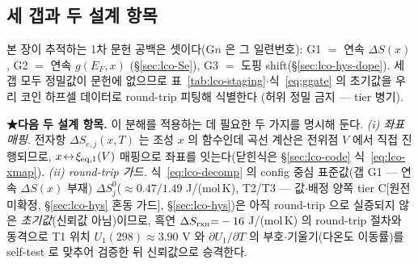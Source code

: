 \subsection{세 갭과 두 설계 항목}\label{sec:lco-decomp-gaps}
본 장이 추적하는 1차 문헌 공백은 셋이다(G$n$ 은 그 일련번호): G1 $=$ 연속 $\Delta S(x)$, G2 $=$ 연속 $g(E_F,x)$
(\S\ref{sec:lco-Se}), G3 $=$ 도핑 shift(\S\ref{sec:lco-hys-dope}). 세 갭 모두 정밀값이 문헌에 없으므로
표~\ref{tab:lco-staging}$\cdot$식~\eqref{eq:ggate} 의 초기값을 우리 코인 하프셀 데이터로 round-trip 피팅해 식별한다
(허위 정밀 금지 --- tier 병기).

\textbf{★다음 두 설계 항목.} 이 분해를 적용하는 데 필요한 두 가지를 명시해 둔다.
\emph{(i) 좌표 매핑.} 전자항 $\Delta S_{e,j}(x,T)$ 는 조성 $x$ 의 함수인데 곡선 계산은 전위점 $V$ 에서 직접 진행되므로,
$x\!\leftrightarrow\!\xi_{\mathrm{eq},1}(V)$ 매핑으로 좌표를 잇는다(닫힌식은 \S\ref{sec:lco-code} 식~\eqref{eq:lco-xmap}).
\emph{(ii) round-trip 가드.} 식~\eqref{eq:lco-decomp} 의 config 중심 표준값(갭 G1 --- 연속 $\Delta S(x)$ 부재)
$\Delta S_j^0$($\approx0.47/1.49$ J/(mol\,K), T2/T3 --- 값$\cdot$배정 양쪽 tier C[원전 미확정, \S\ref{sec:lco-hys} 혼동 가드],
\S\ref{sec:lco-hys})은 아직 round-trip 으로 실증되지 않은
\emph{초기값}(신뢰값 아님)이므로, 흑연 $\Delta S_{\mathrm{rxn}}{=}-16$ J/(mol\,K) 의 round-trip 절차와 동격으로 T1 위치
$U_1(298)\approx3.90$ V 와 $\partial U_1/\partial T$ 의 부호$\cdot$기울기(다온도 이동률)를 self-test 로 맞추어
검증한 뒤 신뢰값으로 승격한다.

